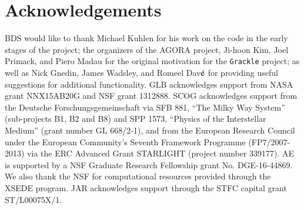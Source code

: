 \section*{Acknowledgements}

BDS would like to thank Michael Kuhlen for his work on the code in the
early stages of the project; the organizers of the AGORA project, Ji-hoon
Kim, Joel Primack, and Piero Madau for the original motivation for the
\texttt{Grackle} project; as well as Nick Gnedin, James Wadsley, and
Romeel Dav$\acute{\rm e}$ for providing useful suggestions for
additional functionality.  GLB acknowledges support from
NASA grant NNX15AB20G and NSF grant 1312888. SCOG acknowledges support
from the Deutsche Forschungsgemeinschaft via SFB 881, ``The Milky Way System'' 
(sub-projects B1, B2 and B8) and SPP 1573, ``Physics of the Interstellar Medium'' 
(grant number GL 668/2-1), and from the European Research Council under the 
European Community's Seventh Framework Programme (FP7/2007-2013) via the ERC 
Advanced Grant STARLIGHT (project number 339177). AE is supported by a NSF Graduate
Research Fellowship grant No. DGE-16-44869. We also thank the NSF for computational
resources provided through the XSEDE program. JAR acknowledges support through the STFC 
capital grant ST/L00075X/1.

